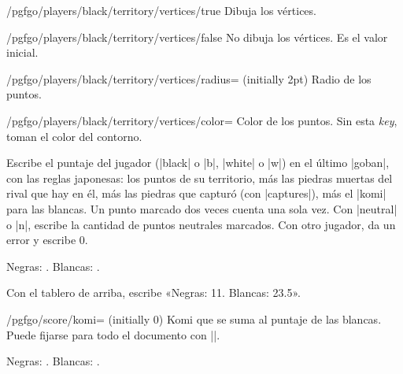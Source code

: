 	\begin{key}{/pgfgo/players/black/territory/vertices/true}
		Dibuja los vértices.
	\end{key}

	\begin{key}{/pgfgo/players/black/territory/vertices/false}
		No dibuja los vértices. Es el valor inicial.
	\end{key}

	\begin{key}{/pgfgo/players/black/territory/vertices/radius= (initially 2pt)}
		Radio de los puntos.
	\end{key}

	\begin{key}{/pgfgo/players/black/territory/vertices/color=}
		Color de los puntos. Sin esta \emph{key}, toman el color del contorno.

		\begin{codeexample}[]
			\begin{goban}[5]
			\end{goban}
		\end{codeexample}
	\end{key}

	\begin{command}{\pgfgoscore{}}
		Escribe el puntaje del jugador (|black| o |b|, |white| o |w|) en el último |goban|, con las reglas japonesas: los puntos de su territorio, más las piedras muertas del rival que hay en él, más las piedras que capturó (con |captures|), más el |komi| para las blancas. Un punto marcado dos veces cuenta una sola vez. Con |neutral| o |n|, escribe la cantidad de puntos neutrales marcados. Con otro jugador, da un error y escribe 0.

		\begin{codeexample}
			Negras: . Blancas: .
		\end{codeexample}

		Con el tablero de arriba, escribe «Negras: 11. Blancas: 23.5».
	\end{command}

	\begin{key}{/pgfgo/score/komi= (initially 0)}
		Komi que se suma al puntaje de las blancas. Puede fijarse para todo el documento con ||.

		\begin{codeexample}[]
			\begin{goban}[5]
			\end{goban}

			Negras: . Blancas: .
		\end{codeexample}
	\end{key}

